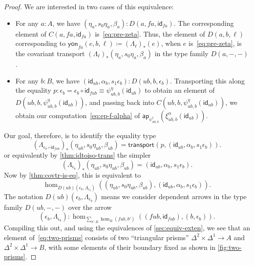 \documentclass[12pt]{amsart}
\theoremstyle{plain}
\theoremstyle{definition}
\theoremstyle{remark}
\numberwithin{equation}{section}
\newcommand{\jdeq}{\equiv}
\newcommand{\defeq}{\coloneqq}
\newcommand{\yon}{\mathsf{yon}}
\newcommand{\connmin}[1]{\mathsf{\Lambda}_{#1}}
\newcommand{\idarr}[1]{\mathsf{id}_{#1}}
\newcommand{\transport}[3]{\mathsf{transport}^{#1}(#2,#3)}%
\newcommand{\ap}{\mathsf{ap}}                             %
\newcommand{\covtr}[1]{{#1}_*}  %
\begin{document}
\begin{proof}
  We are interested in two cases of this equivalence:
  \begin{itemize}
  \item For any $a:A$, we have $(\eta_a,s_0\eta_a,\beta_a):D(a,fa,\idarr{fa})$.
    The corresponding element of $C(a,fa,\idarr{fa})$ is~\eqref{eq:pre-zeta}.
    Thus, the element of $D(a,b,\ell)$ corresponding to $\yon_{fa}(e,b,\ell) \defeq \covtr{(\connmin \ell)}(e)$, when $e$ is~\eqref{eq:pre-zeta}, is the covariant transport $\covtr{(\connmin \ell)}(\eta_a,s_0\eta_a,\beta_a)$ in the type family $D(a,-,-)$.
  \item For any $b:B$, we have $(\idarr{ub},\alpha_b,s_1 \epsilon_b):D(ub,b,\epsilon_b)$.
    Transporting this along the equality $p : \epsilon_b = \epsilon_b \circ \idarr{fub} \jdeq \psi^\eta_{ub,b} (\idarr{ub})$ to obtain an element of $D(ub,b,\psi^\eta_{ub,b} (\idarr{ub}))$, and passing back into $C(ub,b,\psi^\eta_{ub,b} (\idarr{ub}))$, we obtain our computation~\eqref{eq:ep-f-alpha} of $\ap_{\psi^\epsilon_{ub,b}}(\xi^\alpha_{ub,b}(\idarr{ub}))$.
  \end{itemize}
  Our goal, therefore, is to identify the equality type 
  \[\covtr{(\connmin {\epsilon_b\circ \idarr{fub}})}(\eta_{ub},s_0\eta_{ub},\beta_{ub})
  = \transport{}{p}{(\idarr{ub},\alpha_b,s_1 \epsilon_b)}.
  \]
  or equivalently by \cref{thm:idtoiso-trans} the simpler
  \[\covtr{(\connmin {\epsilon_b})}(\eta_{ub},s_0\eta_{ub},\beta_{ub})
  = (\idarr{ub},\alpha_b,s_1 \epsilon_b).
  \]
  Now by \cref{thm:covtr-is-eq}, this is equivalent to
  \begin{equation}
    \hom_{D(ub)(\epsilon_b,\connmin{\epsilon_b})}((\eta_{ub},s_0\eta_{ub},\beta_{ub}), (\idarr{ub},\alpha_b,s_1 \epsilon_b)).\label{eq:two-prisms}
  \end{equation}
  The notation $D(ub)(\epsilon_b,\connmin{\epsilon_b})$ means we consider dependent arrows in the type family $D(ub,-,-)$ over the arrow
  \[ (\epsilon_b,\connmin{\epsilon_b}):\hom_{\sum_{b':B} \hom_B(fub,b')}((fub,\idarr{fub}),(b,\epsilon_b)).\]
  Compiling this out, and using the equivalences of \cref{sec:equiv-exten}, we see that an element of~\eqref{eq:two-prisms} consists of two ``triangular prisms'' $\Delta^2\times\Delta^1 \to A$ and $\Delta^2\times\Delta^1 \to B$, with some elements of their boundary fixed as shown in \cref{fig:two-prisms}.



\end{proof}
\end{document}
